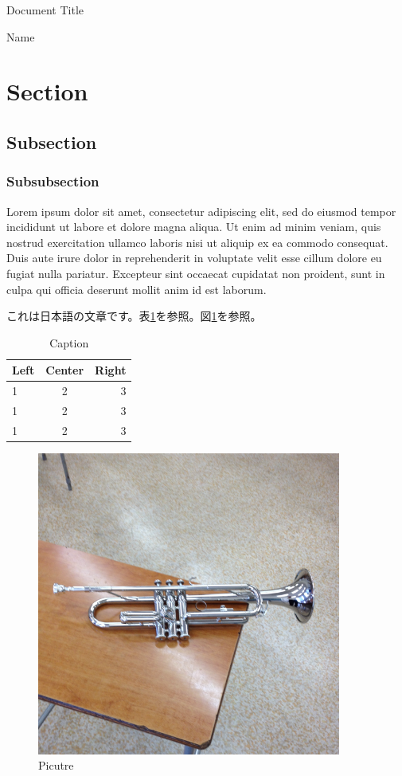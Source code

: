 \documentclass[dvipdfmx,12pt]{ujarticle}
\begin{document}
\begin{center}
{\fontsize{16pt}{16pt}\selectfont Document Title}
\end{center}

\begin{flushright}
Name
\end{flushright}

\section{Section}
\subsection{Subsection}
\subsubsection{Subsubsection}

Lorem ipsum dolor sit amet, consectetur adipiscing elit, sed do eiusmod tempor incididunt ut labore et dolore magna aliqua. Ut enim ad minim veniam, quis nostrud exercitation ullamco laboris nisi ut aliquip ex ea commodo consequat. Duis aute irure dolor in reprehenderit in voluptate velit esse cillum dolore eu fugiat nulla pariatur. Excepteur sint occaecat cupidatat non proident, sunt in culpa qui officia deserunt mollit anim id est laborum.

これは日本語の文章です。表\ref{SampleTable}を参照。図\ref{SampleFigure1}を参照。

\begin{table}[h]
    \caption{Caption}
    \label{SampleTable}
    \centering
    \begin{tabular}{lcr}
        \hline
        Left & Center & Right \\
        \hline \hline
        1 & 2 & 3 \\
        1 & 2 & 3 \\
        1 & 2 & 3 \\
        \hline
    \end{tabular}
\end{table}

\begin{figure}[ht]
    \centering
    \includegraphics[width=10cm]{trp.png}
    \caption{Picutre}
    \label{SampleFigure1}
\end{figure}
\end{document}
